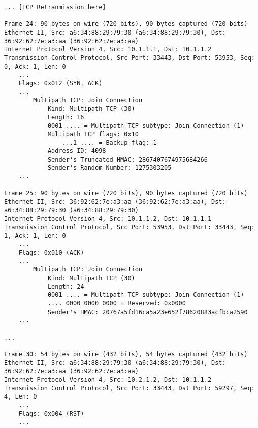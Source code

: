 \begin{verbatim}
... [TCP Retranmission here]

Frame 24: 90 bytes on wire (720 bits), 90 bytes captured (720 bits)
Ethernet II, Src: a6:34:88:29:79:30 (a6:34:88:29:79:30), Dst: 36:92:62:7e:a3:aa (36:92:62:7e:a3:aa)
Internet Protocol Version 4, Src: 10.1.1.1, Dst: 10.1.1.2
Transmission Control Protocol, Src Port: 33443, Dst Port: 53953, Seq: 0, Ack: 1, Len: 0
    ...
    Flags: 0x012 (SYN, ACK)
    ...
        Multipath TCP: Join Connection
            Kind: Multipath TCP (30)
            Length: 16
            0001 .... = Multipath TCP subtype: Join Connection (1)
            Multipath TCP flags: 0x10
                ...1 .... = Backup flag: 1
            Address ID: 4098
            Sender's Truncated HMAC: 2867407674975684266
            Sender's Random Number: 1275303205
    ...

Frame 25: 90 bytes on wire (720 bits), 90 bytes captured (720 bits)
Ethernet II, Src: 36:92:62:7e:a3:aa (36:92:62:7e:a3:aa), Dst: a6:34:88:29:79:30 (a6:34:88:29:79:30)
Internet Protocol Version 4, Src: 10.1.1.2, Dst: 10.1.1.1
Transmission Control Protocol, Src Port: 53953, Dst Port: 33443, Seq: 1, Ack: 1, Len: 0
    ...
    Flags: 0x010 (ACK)
    ...
        Multipath TCP: Join Connection
            Kind: Multipath TCP (30)
            Length: 24
            0001 .... = Multipath TCP subtype: Join Connection (1)
            .... 0000 0000 0000 = Reserved: 0x0000
            Sender's HMAC: 20767a5fd16ca5a23e652f78620883acfbca2590
    ...

...

Frame 30: 54 bytes on wire (432 bits), 54 bytes captured (432 bits)
Ethernet II, Src: a6:34:88:29:79:30 (a6:34:88:29:79:30), Dst: 36:92:62:7e:a3:aa (36:92:62:7e:a3:aa)
Internet Protocol Version 4, Src: 10.2.1.2, Dst: 10.1.1.2
Transmission Control Protocol, Src Port: 33443, Dst Port: 59297, Seq: 4, Len: 0
    ...
    Flags: 0x004 (RST)
    ...
	\end{verbatim}
\endgroup